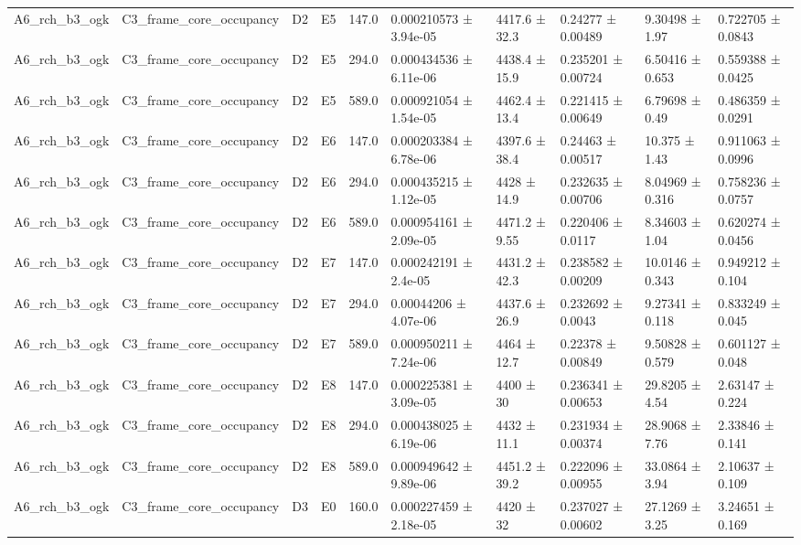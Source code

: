 \begin{table}
\begin{tabular}{llllllllll}
A6\_rch\_b3\_ogk & C3\_frame\_core\_occupancy & D2 & E5 & 147.0 & 0.000210573 ± 3.94e-05 & 4417.6 ± 32.3 & 0.24277 ± 0.00489 & 9.30498 ± 1.97 & 0.722705 ± 0.0843 \\
A6\_rch\_b3\_ogk & C3\_frame\_core\_occupancy & D2 & E5 & 294.0 & 0.000434536 ± 6.11e-06 & 4438.4 ± 15.9 & 0.235201 ± 0.00724 & 6.50416 ± 0.653 & 0.559388 ± 0.0425 \\
A6\_rch\_b3\_ogk & C3\_frame\_core\_occupancy & D2 & E5 & 589.0 & 0.000921054 ± 1.54e-05 & 4462.4 ± 13.4 & 0.221415 ± 0.00649 & 6.79698 ± 0.49 & 0.486359 ± 0.0291 \\
A6\_rch\_b3\_ogk & C3\_frame\_core\_occupancy & D2 & E6 & 147.0 & 0.000203384 ± 6.78e-06 & 4397.6 ± 38.4 & 0.24463 ± 0.00517 & 10.375 ± 1.43 & 0.911063 ± 0.0996 \\
A6\_rch\_b3\_ogk & C3\_frame\_core\_occupancy & D2 & E6 & 294.0 & 0.000435215 ± 1.12e-05 & 4428 ± 14.9 & 0.232635 ± 0.00706 & 8.04969 ± 0.316 & 0.758236 ± 0.0757 \\
A6\_rch\_b3\_ogk & C3\_frame\_core\_occupancy & D2 & E6 & 589.0 & 0.000954161 ± 2.09e-05 & 4471.2 ± 9.55 & 0.220406 ± 0.0117 & 8.34603 ± 1.04 & 0.620274 ± 0.0456 \\
A6\_rch\_b3\_ogk & C3\_frame\_core\_occupancy & D2 & E7 & 147.0 & 0.000242191 ± 2.4e-05 & 4431.2 ± 42.3 & 0.238582 ± 0.00209 & 10.0146 ± 0.343 & 0.949212 ± 0.104 \\
A6\_rch\_b3\_ogk & C3\_frame\_core\_occupancy & D2 & E7 & 294.0 & 0.00044206 ± 4.07e-06 & 4437.6 ± 26.9 & 0.232692 ± 0.0043 & 9.27341 ± 0.118 & 0.833249 ± 0.045 \\
A6\_rch\_b3\_ogk & C3\_frame\_core\_occupancy & D2 & E7 & 589.0 & 0.000950211 ± 7.24e-06 & 4464 ± 12.7 & 0.22378 ± 0.00849 & 9.50828 ± 0.579 & 0.601127 ± 0.048 \\
A6\_rch\_b3\_ogk & C3\_frame\_core\_occupancy & D2 & E8 & 147.0 & 0.000225381 ± 3.09e-05 & 4400 ± 30 & 0.236341 ± 0.00653 & 29.8205 ± 4.54 & 2.63147 ± 0.224 \\
A6\_rch\_b3\_ogk & C3\_frame\_core\_occupancy & D2 & E8 & 294.0 & 0.000438025 ± 6.19e-06 & 4432 ± 11.1 & 0.231934 ± 0.00374 & 28.9068 ± 7.76 & 2.33846 ± 0.141 \\
A6\_rch\_b3\_ogk & C3\_frame\_core\_occupancy & D2 & E8 & 589.0 & 0.000949642 ± 9.89e-06 & 4451.2 ± 39.2 & 0.222096 ± 0.00955 & 33.0864 ± 3.94 & 2.10637 ± 0.109 \\
A6\_rch\_b3\_ogk & C3\_frame\_core\_occupancy & D3 & E0 & 160.0 & 0.000227459 ± 2.18e-05 & 4420 ± 32 & 0.237027 ± 0.00602 & 27.1269 ± 3.25 & 3.24651 ± 0.169 \\

\end{tabular}
\end{table}
